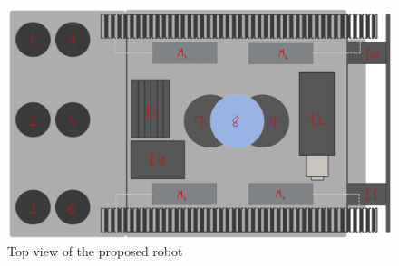 \newpage

\begin{figure}[!ht]
  \centering
	\includegraphics[width=13cm]{00 - Images/top_view_sp2.png}
  \caption{Top view of the proposed robot}
  \label{fig:top_view_sp,}
\end{figure}

